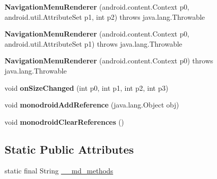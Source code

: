 \begin{DoxyCompactItemize}
\item 
\mbox{\label{classmd5b60ffeb829f638581ab2bb9b1a7f4f3f_1_1_navigation_menu_renderer_ae74ab61a213bee8a3bbfcd4d6caa561c}} 
{\bfseries Navigation\+Menu\+Renderer} (android.\+content.\+Context p0, android.\+util.\+Attribute\+Set p1, int p2)  throws java.\+lang.\+Throwable 	
\item 
\mbox{\label{classmd5b60ffeb829f638581ab2bb9b1a7f4f3f_1_1_navigation_menu_renderer_ad19d1ffa5f6f7658e40c2aad315f1531}} 
{\bfseries Navigation\+Menu\+Renderer} (android.\+content.\+Context p0, android.\+util.\+Attribute\+Set p1)  throws java.\+lang.\+Throwable 	
\item 
\mbox{\label{classmd5b60ffeb829f638581ab2bb9b1a7f4f3f_1_1_navigation_menu_renderer_ab221cd03a920958ca9a3c7cce213642f}} 
{\bfseries Navigation\+Menu\+Renderer} (android.\+content.\+Context p0)  throws java.\+lang.\+Throwable 	
\item 
\mbox{\label{classmd5b60ffeb829f638581ab2bb9b1a7f4f3f_1_1_navigation_menu_renderer_a9eb26dd23dc63aa4a5652b61f28def49}} 
void {\bfseries on\+Size\+Changed} (int p0, int p1, int p2, int p3)
\item 
\mbox{\label{classmd5b60ffeb829f638581ab2bb9b1a7f4f3f_1_1_navigation_menu_renderer_a28a29aa89bcd264a300fc518ddef9f73}} 
void {\bfseries monodroid\+Add\+Reference} (java.\+lang.\+Object obj)
\item 
\mbox{\label{classmd5b60ffeb829f638581ab2bb9b1a7f4f3f_1_1_navigation_menu_renderer_a8d79995c853bf4f40da4f067cd501048}} 
void {\bfseries monodroid\+Clear\+References} ()
\end{DoxyCompactItemize}
\subsection*{Static Public Attributes}
\begin{DoxyCompactItemize}
\item 
static final String \hyperlink{classmd5b60ffeb829f638581ab2bb9b1a7f4f3f_1_1_navigation_menu_renderer_a0f4bfebe2cdfd607a2a7599e832cfbdc}{\+\_\+\+\_\+md\+\_\+methods}
\end{DoxyCompactItemize}


